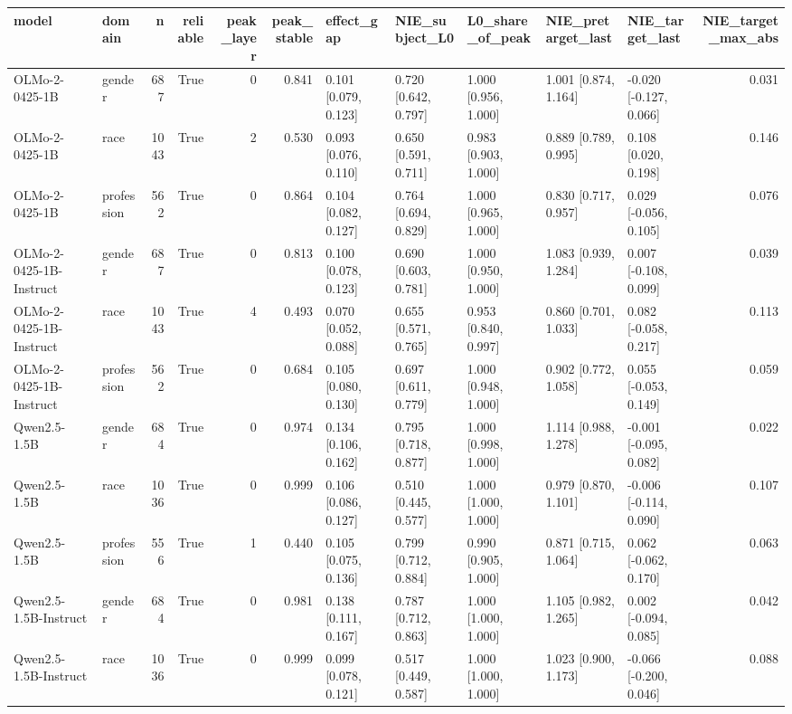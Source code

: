 \begin{tabular}{llrrrrlllllr}
\toprule
model & domain & n & reliable & peak_layer & peak_stable & effect_gap & NIE_subject_L0 & L0_share_of_peak & NIE_pretarget_last & NIE_target_last & NIE_target_max_abs \\
\midrule
OLMo-2-0425-1B & gender & 687 & True & 0 & 0.841 & 0.101 [0.079, 0.123] & 0.720 [0.642, 0.797] & 1.000 [0.956, 1.000] & 1.001 [0.874, 1.164] & -0.020 [-0.127, 0.066] & 0.031 \\
OLMo-2-0425-1B & race & 1043 & True & 2 & 0.530 & 0.093 [0.076, 0.110] & 0.650 [0.591, 0.711] & 0.983 [0.903, 1.000] & 0.889 [0.789, 0.995] & 0.108 [0.020, 0.198] & 0.146 \\
OLMo-2-0425-1B & profession & 562 & True & 0 & 0.864 & 0.104 [0.082, 0.127] & 0.764 [0.694, 0.829] & 1.000 [0.965, 1.000] & 0.830 [0.717, 0.957] & 0.029 [-0.056, 0.105] & 0.076 \\
OLMo-2-0425-1B-Instruct & gender & 687 & True & 0 & 0.813 & 0.100 [0.078, 0.123] & 0.690 [0.603, 0.781] & 1.000 [0.950, 1.000] & 1.083 [0.939, 1.284] & 0.007 [-0.108, 0.099] & 0.039 \\
OLMo-2-0425-1B-Instruct & race & 1043 & True & 4 & 0.493 & 0.070 [0.052, 0.088] & 0.655 [0.571, 0.765] & 0.953 [0.840, 0.997] & 0.860 [0.701, 1.033] & 0.082 [-0.058, 0.217] & 0.113 \\
OLMo-2-0425-1B-Instruct & profession & 562 & True & 0 & 0.684 & 0.105 [0.080, 0.130] & 0.697 [0.611, 0.779] & 1.000 [0.948, 1.000] & 0.902 [0.772, 1.058] & 0.055 [-0.053, 0.149] & 0.059 \\
Qwen2.5-1.5B & gender & 684 & True & 0 & 0.974 & 0.134 [0.106, 0.162] & 0.795 [0.718, 0.877] & 1.000 [0.998, 1.000] & 1.114 [0.988, 1.278] & -0.001 [-0.095, 0.082] & 0.022 \\
Qwen2.5-1.5B & race & 1036 & True & 0 & 0.999 & 0.106 [0.086, 0.127] & 0.510 [0.445, 0.577] & 1.000 [1.000, 1.000] & 0.979 [0.870, 1.101] & -0.006 [-0.114, 0.090] & 0.107 \\
Qwen2.5-1.5B & profession & 556 & True & 1 & 0.440 & 0.105 [0.075, 0.136] & 0.799 [0.712, 0.884] & 0.990 [0.905, 1.000] & 0.871 [0.715, 1.064] & 0.062 [-0.062, 0.170] & 0.063 \\
Qwen2.5-1.5B-Instruct & gender & 684 & True & 0 & 0.981 & 0.138 [0.111, 0.167] & 0.787 [0.712, 0.863] & 1.000 [1.000, 1.000] & 1.105 [0.982, 1.265] & 0.002 [-0.094, 0.085] & 0.042 \\
Qwen2.5-1.5B-Instruct & race & 1036 & True & 0 & 0.999 & 0.099 [0.078, 0.121] & 0.517 [0.449, 0.587] & 1.000 [1.000, 1.000] & 1.023 [0.900, 1.173] & -0.066 [-0.200, 0.046] & 0.088 \\

\end{tabular}
